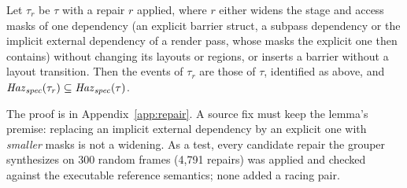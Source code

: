 \begin{lemma}\label{lem:repair}
Let $\tau_r$ be $\tau$ with a repair $r$ applied, where $r$ either widens the stage and access masks of one
dependency (an explicit barrier struct, a subpass dependency or the implicit external dependency of a render pass,
whose masks the explicit one then contains) without changing its layouts or regions, or inserts a barrier without
a layout transition. Then the events of $\tau_r$ are those of $\tau$, identified as above, and
$\mathit{Haz}_{\mathit{spec}}(\tau_r) \subseteq \mathit{Haz}_{\mathit{spec}}(\tau)$.
\end{lemma}

The proof is in Appendix~\ref{app:repair}. A source fix must keep the lemma's premise: replacing an implicit external
dependency by an explicit one with \emph{smaller} masks is not a widening. As a test, every candidate repair the
grouper synthesizes on 300 random frames (4,791 repairs) was applied and checked against the executable reference
semantics; none added a racing pair.
